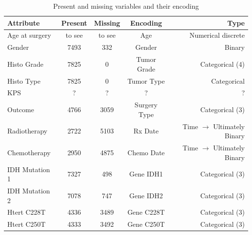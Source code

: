 \documentclass[a4paper]{article}
\begin{document}
\begin{table}[tb]
\vskip 3mm
\begin{center}
\begin{small}
\begin{sc}
\begin{tabular}{lcccr}
\hline
Attribute & Present & Missing & Encoding &Type \\
\hline
Age at surgery & to see & to see& Age & Numerical discrete  \\%
Gender  & 7493 & 332 & Gender & Binary\\
Histo Grade    & 7825& 0&  Tumor Grade & Categorical (4)      \\
Histo Type    & 7825& 0&  Tumor Type & Categorical   \\
KPS    & ?& ?&  ?  &?    \\
Outcome & 4766 & 3059 & Surgery Type & Categorical (3)\\
Radiotherapy    & 2722& 5103&  Rx Date  & Time $\to$ Ultimately Binary \\
Chemotherapy   & 2950& 4875&  Chemo Date  &Time $\to$ Ultimately Binary    \\
IDH Mutation 1   & 7327& 498&  Gene IDH1 & Categorical (3)   \\
IDH Mutation 2   &7078 & 747&  Gene IDH2   & Categorical (3) \\
Htert C228T & 4336 & 3489 & Gene C228T & Categorical (3)\\ 
Htert C250T & 4333 & 3492 & Gene C250T  & Categorical (3) \\ 
\hline
\end{tabular}
\end{sc}
\end{small}
\caption{Present and missing variables and their encoding}
\label{tab:encoding}
\end{center}
\vskip -3mm
\end{table}
\end{document}
